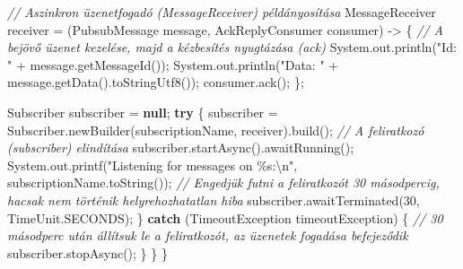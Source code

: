\documentclass[
]{article}
\newenvironment{Shaded}{}{}
\newcommand{\BuiltInTok}[1]{\textcolor[rgb]{0.00,0.50,0.00}{#1}}
\newcommand{\CommentTok}[1]{\textcolor[rgb]{0.38,0.63,0.69}{\textit{#1}}}
\newcommand{\ControlFlowTok}[1]{\textcolor[rgb]{0.00,0.44,0.13}{\textbf{#1}}}
\newcommand{\DecValTok}[1]{\textcolor[rgb]{0.25,0.63,0.44}{#1}}
\newcommand{\FunctionTok}[1]{\textcolor[rgb]{0.02,0.16,0.49}{#1}}
\newcommand{\KeywordTok}[1]{\textcolor[rgb]{0.00,0.44,0.13}{\textbf{#1}}}
\newcommand{\NormalTok}[1]{#1}
\newcommand{\OperatorTok}[1]{\textcolor[rgb]{0.40,0.40,0.40}{#1}}
\newcommand{\SpecialCharTok}[1]{\textcolor[rgb]{0.25,0.44,0.63}{#1}}
\newcommand{\StringTok}[1]{\textcolor[rgb]{0.25,0.44,0.63}{#1}}
\begin{document}
\begin{Shaded}
\begin{Highlighting}[]
    \CommentTok{// Aszinkron üzenetfogadó (MessageReceiver) példányosítása}
\NormalTok{    MessageReceiver receiver }\OperatorTok{=}
        \OperatorTok{(}\NormalTok{PubsubMessage message}\OperatorTok{,}\NormalTok{ AckReplyConsumer consumer}\OperatorTok{)} \OperatorTok{{-}\textgreater{}} \OperatorTok{\{}
          \CommentTok{// A bejövő üzenet kezelése, majd a kézbesítés nyugtázása (ack)}
          \BuiltInTok{System}\OperatorTok{.}\FunctionTok{out}\OperatorTok{.}\FunctionTok{println}\OperatorTok{(}\StringTok{"Id: "} \OperatorTok{+}\NormalTok{ message}\OperatorTok{.}\FunctionTok{getMessageId}\OperatorTok{());}
          \BuiltInTok{System}\OperatorTok{.}\FunctionTok{out}\OperatorTok{.}\FunctionTok{println}\OperatorTok{(}\StringTok{"Data: "} \OperatorTok{+}\NormalTok{ message}\OperatorTok{.}\FunctionTok{getData}\OperatorTok{().}\FunctionTok{toStringUtf8}\OperatorTok{());}
\NormalTok{          consumer}\OperatorTok{.}\FunctionTok{ack}\OperatorTok{();}
        \OperatorTok{\};}

\NormalTok{    Subscriber subscriber }\OperatorTok{=} \KeywordTok{null}\OperatorTok{;}
    \ControlFlowTok{try} \OperatorTok{\{}
\NormalTok{      subscriber }\OperatorTok{=}\NormalTok{ Subscriber}\OperatorTok{.}\FunctionTok{newBuilder}\OperatorTok{(}\NormalTok{subscriptionName}\OperatorTok{,}\NormalTok{ receiver}\OperatorTok{).}\FunctionTok{build}\OperatorTok{();}
      \CommentTok{// A feliratkozó (subscriber) elindítása}
\NormalTok{      subscriber}\OperatorTok{.}\FunctionTok{startAsync}\OperatorTok{().}\FunctionTok{awaitRunning}\OperatorTok{();}
      \BuiltInTok{System}\OperatorTok{.}\FunctionTok{out}\OperatorTok{.}\FunctionTok{printf}\OperatorTok{(}\StringTok{"Listening for messages on }\SpecialCharTok{\%s}\StringTok{:}\SpecialCharTok{\textbackslash{}n}\StringTok{"}\OperatorTok{,}\NormalTok{ subscriptionName}\OperatorTok{.}\FunctionTok{toString}\OperatorTok{());}
      \CommentTok{// Engedjük futni a feliratkozót 30 másodpercig, hacsak nem történik helyrehozhatatlan hiba}
\NormalTok{      subscriber}\OperatorTok{.}\FunctionTok{awaitTerminated}\OperatorTok{(}\DecValTok{30}\OperatorTok{,} \BuiltInTok{TimeUnit}\OperatorTok{.}\FunctionTok{SECONDS}\OperatorTok{);}
    \OperatorTok{\}} \ControlFlowTok{catch} \OperatorTok{(}\BuiltInTok{TimeoutException}\NormalTok{ timeoutException}\OperatorTok{)} \OperatorTok{\{}
      \CommentTok{// 30 másodperc után állítsuk le a feliratkozót, az üzenetek fogadása befejeződik}
\NormalTok{      subscriber}\OperatorTok{.}\FunctionTok{stopAsync}\OperatorTok{();}
    \OperatorTok{\}}
  \OperatorTok{\}}
\OperatorTok{\}}
\end{Highlighting}
\end{Shaded}
\end{document}
